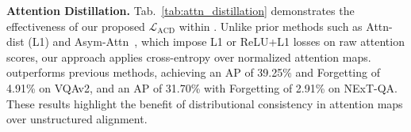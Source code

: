 \noindent {} \textbf{Attention Distillation. }Tab.~\ref{tab:attn_distillation} demonstrates the effectiveness of our proposed {$\mathcal{L}_{\text{ACD}}$} within \qstmethodshort{}. Unlike prior methods such as Attn-dist (L1) and Asym-Attn~\citep{pelosin2022towards}, which impose L1 or ReLU+L1 losses on raw attention scores, our approach applies cross-entropy over normalized attention maps. \qstmethodshort{} outperforms previous methods, achieving an AP of 39.25\% and Forgetting of 4.91\% on VQAv2, and an AP of 31.70\% with Forgetting of 2.91\% on NExT-QA. These results highlight the benefit of distributional consistency in attention maps over unstructured alignment.
\begin{table}[t]
    \centering
    \caption{Ablation study of \qstmethodshort{} components.} %
    \vspace{-3mm}
    \renewcommand{\arraystretch}{1.2}
    \setlength{\tabcolsep}{8pt}
    \vspace{-3mm}
    \label{tab:comparison_distillation}
\end{table}
